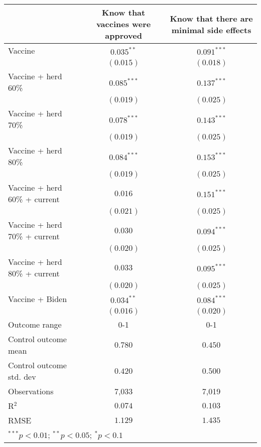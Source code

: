 \begin{table}
\begin{center}
\begin{tabular}{l c c}
\hline
 & Know that vaccines were approved & Know that there are minimal side effects \\
\hline
Vaccine                       & $0.035^{**}$  & $0.091^{***}$ \\
                              & $(0.015)$     & $(0.018)$     \\
Vaccine + herd 60\%           & $0.085^{***}$ & $0.137^{***}$ \\
                              & $(0.019)$     & $(0.025)$     \\
Vaccine + herd 70\%           & $0.078^{***}$ & $0.143^{***}$ \\
                              & $(0.019)$     & $(0.025)$     \\
Vaccine + herd 80\%           & $0.084^{***}$ & $0.153^{***}$ \\
                              & $(0.019)$     & $(0.025)$     \\
Vaccine + herd 60\% + current & $0.016$       & $0.151^{***}$ \\
                              & $(0.021)$     & $(0.025)$     \\
Vaccine + herd 70\% + current & $0.030$       & $0.094^{***}$ \\
                              & $(0.020)$     & $(0.025)$     \\
Vaccine + herd 80\% + current & $0.033$       & $0.095^{***}$ \\
                              & $(0.020)$     & $(0.025)$     \\
Vaccine + Biden               & $0.034^{**}$  & $0.084^{***}$ \\
                              & $(0.016)$     & $(0.020)$     \\
\hline
Outcome range                 & 0-1           & 0-1           \\
Control outcome mean          & $0.780$       & $0.450$       \\
Control outcome std. dev      & $0.420$       & $0.500$       \\
Observations                  & 7,033         & 7,019         \\
R$^{2}$                       & $0.074$       & $0.103$       \\
RMSE                          & $1.129$       & $1.435$       \\
\hline
\multicolumn{3}{l}{\scriptsize{$^{***}p<0.01$; $^{**}p<0.05$; $^{*}p<0.1$}}
\end{tabular}
\caption{}
\label{table:SI_table4_manip_B}
\end{center}
\end{table}
